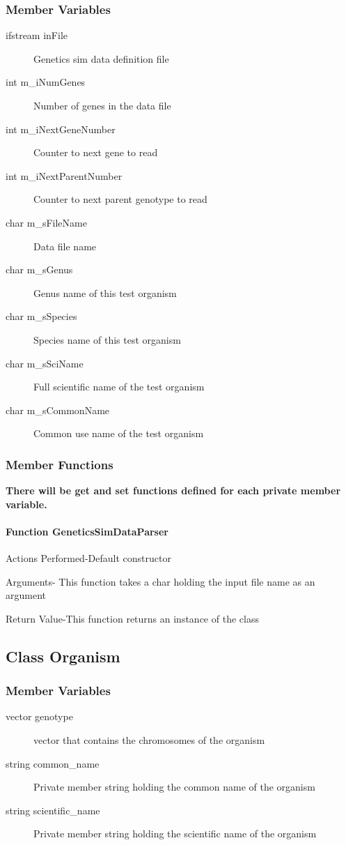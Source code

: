 \documentclass{article}
\begin{document}
\subsubsection{Member Variables}
\begin{description}
\item[ifstream inFile] Genetics sim data definition file
\item[int m\_iNumGenes] Number of genes in the data file
\item[int m\_iNextGeneNumber] Counter to next gene to read
\item[int m\_iNextParentNumber] Counter to next parent genotype to read
\item[char m\_sFileName] Data file name
\item[char m\_sGenus] Genus name of this test organism
\item[char m\_sSpecies] Species name of this test organism
\item[char m\_sSciName] Full scientific name of the test organism
\item[char m\_sCommonName] Common use name of the test organism
\end{description}
\subsubsection{Member Functions}
\textbf{There will be get and set functions defined for each private member variable.}
\paragraph{Function GeneticsSimDataParser}
Actions Performed-Default constructor
                 
Arguments- This function takes a char holding the input file name as an argument
                    
Return Value-This function returns an instance of the class


\newpage
\subsection{Class Organism}
\subsubsection{Member Variables}
\begin{description}
\item[vector genotype] vector that contains the chromosomes of the organism
\item[string common\_name] Private member string holding the common name of the organism
\item[string scientific\_name] Private member string holding the scientific name of the organism
\end{description}
\end{document}
